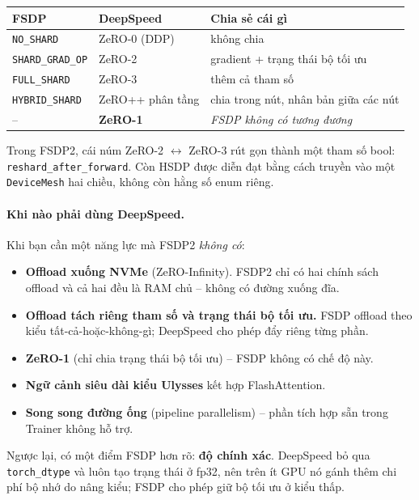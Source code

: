 \begin{center}
\small
\begin{tabular}{@{}lll@{}}
\toprule
\textbf{FSDP} & \textbf{DeepSpeed} & \textbf{Chia sẻ cái gì} \\
\midrule
\texttt{NO\_SHARD} & ZeRO-0 (DDP) & không chia \\
\texttt{SHARD\_GRAD\_OP} & ZeRO-2 & gradient + trạng thái bộ tối ưu \\
\texttt{FULL\_SHARD} & ZeRO-3 & thêm cả tham số \\
\texttt{HYBRID\_SHARD} & ZeRO++ phân tầng & chia trong nút, nhân bản giữa các nút \\
-- & \textbf{ZeRO-1} & \textit{FSDP không có tương đương} \\
\bottomrule
\end{tabular}
\end{center}

\noindent Trong FSDP2, cái núm ZeRO-2 $\leftrightarrow$ ZeRO-3 rút gọn thành một tham số bool: \texttt{reshard\_\allowbreak after\_\allowbreak forward}. Còn HSDP được diễn đạt bằng cách truyền vào một \texttt{DeviceMesh} hai chiều, không còn hằng số enum riêng.

\paragraph{Khi nào phải dùng DeepSpeed.} Khi bạn cần một năng lực mà FSDP2 \emph{không có}:
\begin{itemize}
	\item \textbf{Offload xuống NVMe} (ZeRO-Infinity). FSDP2 chỉ có hai chính sách offload và cả hai đều là RAM chủ -- không có đường xuống đĩa.
	\item \textbf{Offload tách riêng tham số và trạng thái bộ tối ưu.} FSDP offload theo kiểu tất-cả-hoặc-không-gì; DeepSpeed cho phép đẩy riêng từng phần.
	\item \textbf{ZeRO-1} (chỉ chia trạng thái bộ tối ưu) -- FSDP không có chế độ này.
	\item \textbf{Ngữ cảnh siêu dài kiểu Ulysses} kết hợp FlashAttention.
	\item \textbf{Song song đường ống} (pipeline parallelism) -- phần tích hợp sẵn trong Trainer không hỗ trợ.
\end{itemize}
Ngược lại, có một điểm FSDP hơn rõ: \textbf{độ chính xác}. DeepSpeed bỏ qua \texttt{torch\_dtype} và luôn tạo trạng thái ở fp32, nên trên ít GPU nó gánh thêm chi phí bộ nhớ do nâng kiểu; FSDP cho phép giữ bộ tối ưu ở kiểu thấp.

